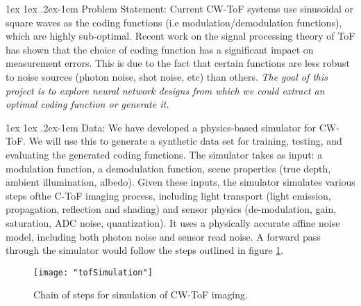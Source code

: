 \documentclass[11pt]{article}
\makeatletter
\renewcommand{\paragraph}{%
  \@startsection{paragraph}{4}%
  {\z@}{1ex \@plus 1ex \@minus .2ex}{-1em}%
  {\normalfont\normalsize\bfseries}%
}
\makeatother
\begin{document}
\paragraph{Problem Statement:} Current CW-ToF systems use sinusoidal or square waves as the coding functions (i.e modulation/demodulation functions), which are highly sub-optimal. Recent work on the signal processing theory of ToF has shown that the choice of coding function has a significant impact on measurement errors. This is due to the fact that certain functions are less robust to noise sources (photon noise, shot noise, etc) than others. \textit{The goal of this project is to explore neural network designs from which we could extract an optimal coding function or generate it.}

\paragraph{Data:} We have developed a physics-based simulator for CW-ToF. We will use this to generate a synthetic data set for training, testing, and evaluating the generated coding functions. The simulator takes as input: a modulation function, a demodulation function, scene properties (true depth, ambient illumination, albedo).%
Given these inputs, the simulator simulates various steps ofthe C-ToF imaging process, including light transport (light emission, propagation, reflection and shading) and sensor physics (de-modulation, gain, saturation, ADC noise, quantization). It uses a physically accurate affine noise model, including both photon noise and sensor read noise. A forward pass through the simulator would follow the steps outlined in figure \ref{fig:tofSimulation}.  

\begin{figure}[h]
\centerline{%
\texttt{[image: "tofSimulation"]}%
}
\caption{Chain of steps for simulation of CW-ToF imaging.}
\label{fig:tofSimulation}
\end{figure}
\end{document}
